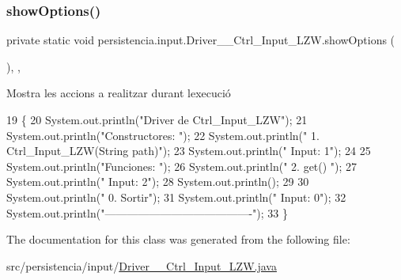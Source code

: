 \subsubsection{\texorpdfstring{show\+Options()}{showOptions()}}
{\footnotesize\ttfamily private static void persistencia.\+input.\+Driver\+\_\+\+\_\+\+Ctrl\+\_\+\+Input\+\_\+\+L\+Z\+W.\+show\+Options (\begin{DoxyParamCaption}{ }\end{DoxyParamCaption})\hspace{0.3cm}{\ttfamily [inline]}, {\ttfamily [static]}, {\ttfamily [private]}}



Mostra les accions a realitzar durant l\textquotesingle{}execució 


\begin{DoxyCode}
19                                      \{
20         System.out.println(\textcolor{stringliteral}{"Driver de Ctrl\_Input\_LZW"});
21         System.out.println(\textcolor{stringliteral}{"Constructores: "});
22         System.out.println(\textcolor{stringliteral}{"     1. Ctrl\_Input\_LZW(String path)"});
23         System.out.println(\textcolor{stringliteral}{"     Input: 1"});
24 
25         System.out.println(\textcolor{stringliteral}{"Funciones: "});
26         System.out.println(\textcolor{stringliteral}{"     2. get() "});
27         System.out.println(\textcolor{stringliteral}{"     Input: 2"});
28         System.out.println();
29 
30         System.out.println(\textcolor{stringliteral}{"     0. Sortir"});
31         System.out.println(\textcolor{stringliteral}{"     Input: 0"});
32         System.out.println(\textcolor{stringliteral}{"----------------------------------------"});
33     \}
\end{DoxyCode}


The documentation for this class was generated from the following file\+:\begin{DoxyCompactItemize}
\item 
src/persistencia/input/\hyperlink{Driver____Ctrl__Input__LZW_8java}{Driver\+\_\+\+\_\+\+Ctrl\+\_\+\+Input\+\_\+\+L\+Z\+W.\+java}\end{DoxyCompactItemize}
